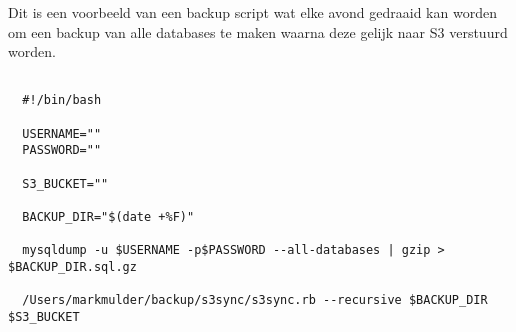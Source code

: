 Dit is een voorbeeld van een backup script wat elke avond gedraaid kan worden om een backup van alle databases te maken waarna deze gelijk naar S3 verstuurd worden.

\begin{verbatim}
  
  #!/bin/bash
  
  USERNAME=""
  PASSWORD=""
  
  S3_BUCKET=""

  BACKUP_DIR="$(date +%F)"

  mysqldump -u $USERNAME -p$PASSWORD --all-databases | gzip > $BACKUP_DIR.sql.gz

  /Users/markmulder/backup/s3sync/s3sync.rb --recursive $BACKUP_DIR $S3_BUCKET
  
\end{verbatim}